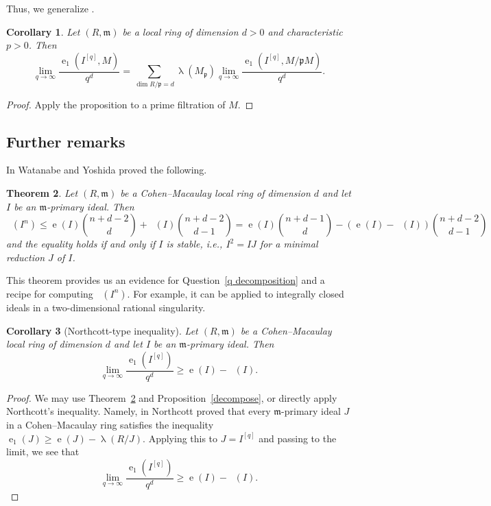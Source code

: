 \documentclass[12pt]{amsart}
\newcommand{\length}{\operatorname{\lambda}}
\newcommand{\mf}[1]{\mathfrak #1}
\DeclareMathOperator{\eh}{e}
\DeclareMathOperator{\ehk}{e_{HK}}
\renewcommand{\frq}[1]{{#1}^{[q]}}
\newtheorem{theorem}{Theorem}
\newtheorem{corollary}[theorem]{Corollary}
\theoremstyle{definition}
\theoremstyle{remark}
\numberwithin{theorem}{section}
\numberwithin{equation}{section}
\begin{document}
Thus, we generalize \cite[Proposition~3.8]{Trivedi}.

\begin{corollary}
Let $(R, \mf m)$ be a local ring of dimension $d > 0$ and characteristic $p > 0$.
Then 
\[
\lim_{q \to \infty} \frac{\eh_1(\frq{I}, M)}{q^d} = 
\sum_{\dim R/\mf p = d} 
\length (M_\mf p) \lim_{q \to \infty} \frac{\eh_1(\frq{I}, M/\mf pM)}{q^d}.
\]
\end{corollary}
\begin{proof}
Apply the proposition to a prime filtration of $M$. 
\end{proof}


\subsection{Further remarks}

In  \cite{WatanabeYoshidaTwo}
Watanabe and Yoshida proved the following.

\begin{theorem}\label{WY}
Let $(R, \mf m)$ be a Cohen--Macaulay local ring of dimension $d$  and let $I$ be an $\mf m$-primary ideal. 
Then 
\[
\ehk(I^n) \leq \eh(I) \binom{n + d - 2}{d} + \ehk(I)\binom{n + d -2}{d - 1}
= \eh(I) \binom{n + d - 1}{d} - (\eh(I) - \ehk(I)) \binom{n + d - 2}{d-1}
\]
and the equality holds if and only if $I$ is stable, i.e., $I^2 = IJ$ for a minimal reduction $J$ of $I$.
\end{theorem}

This theorem provides us an evidence for Question~\ref{q decomposition} and a recipe 
for computing $\ehk(I^n)$. For example, it can be applied to integrally closed ideals in a two-dimensional 
rational singularity. 

\begin{corollary}[Northcott-type inequality]
Let $(R, \mf m)$ be a Cohen--Macaulay local ring of dimension $d$ and let $I$ be an $\mf m$-primary ideal. 
Then 
\[
\lim_{q \to \infty} \frac{\eh_1(\frq{I})}{q^d} \geq \eh(I) - \ehk(I).  
\]
\end{corollary}
\begin{proof}
We may use Theorem~\ref{WY} and Proposition~\ref{decompose}, or directly apply Northcott's inequality.
Namely, in \cite[Theorem~1]{Northcott} Northcott proved that every $\mf m$-primary ideal $J$
in a Cohen--Macaulay ring satisfies the inequality
$\eh_1(J) \geq \eh(J) - \length (R/J)$.
Applying this to $J = \frq{I}$ and passing to the limit, we see that 
\[
\lim_{q \to \infty} \frac{\eh_1(\frq{I})}{q^d} \geq \eh(I) - \ehk(I). 
\]
\end{proof}
\end{document}
